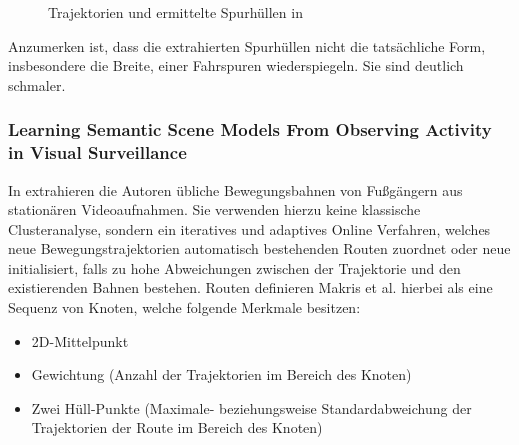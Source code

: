 \begin{figure}[H]
    \centering
    \caption[Spurhüllen in Hu et al.]{Trajektorien und ermittelte Spurhüllen in \cite[]{WeimingHu2006}}
    \label{fig:relw_hu_example_envelope}
\end{figure}

Anzumerken ist, dass die extrahierten Spurhüllen nicht die tatsächliche Form, insbesondere die Breite, einer Fahrspuren
wiederspiegeln. Sie sind deutlich schmaler.


\subsubsection*{Learning Semantic Scene Models From Observing Activity in Visual Surveillance}
In \cite[]{Makris2005} extrahieren die Autoren übliche Bewegungsbahnen von Fußgängern aus stationären Videoaufnahmen.
Sie verwenden hierzu keine klassische Clusteranalyse, sondern ein iteratives und adaptives Online Verfahren,
welches neue Bewegungstrajektorien automatisch bestehenden Routen zuordnet oder neue initialisiert,
falls zu hohe Abweichungen zwischen der Trajektorie und den existierenden Bahnen bestehen.
Routen definieren Makris et al. hierbei als eine Sequenz von Knoten, welche folgende Merkmale besitzen:

\begin{itemize}
    \item 2D-Mittelpunkt
    \item Gewichtung (Anzahl der Trajektorien im Bereich des Knoten)
    \item Zwei Hüll-Punkte (Maximale- beziehungsweise Standardabweichung der Trajektorien der Route im Bereich des Knoten)
\end{itemize}

